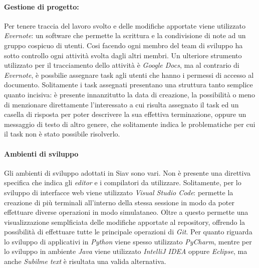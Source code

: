 \paragraph{Gestione di progetto:}
Per tenere traccia del lavoro svolto e delle modifiche apportate viene utilizzato \textit{Evernote}: un software che permette la scrittura e la condivisione di note ad un gruppo cospicuo di utenti. Cosi facendo ogni membro del team di sviluppo ha sotto controllo ogni attività svolta dagli altri membri.
Un ulteriore strumento utilizzato per il tracciamento dello attività è \textit{Google Docs}, ma al contrario di \textit{Evernote}, è possbilie assegnare task agli utenti che hanno i permessi di accesso al documento. Solitamente i task assegnati presentano una struttura tanto semplice quanto incisiva: è presente innanzitutto la data di creazione, la possibilità o meno di menzionare direttamente l'interessato a cui risulta assegnato il task ed un casella di risposta per poter descrivere la sua effettiva terminazione, oppure un messaggio di testo di altro genere, che solitamente indica le problematiche per cui il task non è stato possibile risolverlo. 
\paragraph{Ambienti di sviluppo}
Gli ambienti di sviluppo adottati in Siav sono vari. Non è presente una direttiva specifica che indica gli \textit{editor} e i compilatori da utilizzare. Solitamente, per lo sviluppo di interfacce web viene utilizzato \textit{Visual Studio Code}: permette la creazione di più terminali all'interno della stessa sessione in modo da poter effettuare diverse operazioni in modo simulataneo. Oltre a questo permette una visualizzazione semplficiata delle modifiche apportate al repository, offrendo la possibilità di effettuare tutte le principale operazioni di \textit{Git}.
Per quanto riguarda lo sviluppo di applicativi in \textit{Python} viene spesso utilizzato \textit{PyCharm}, mentre per lo sviluppo in ambiente \textit{Java} viene utilizzato \textit{IntelliJ IDEA} oppure \textit{Eclipse}, ma anche \textit{Subilme text} è risultata una valida alternativa.  
